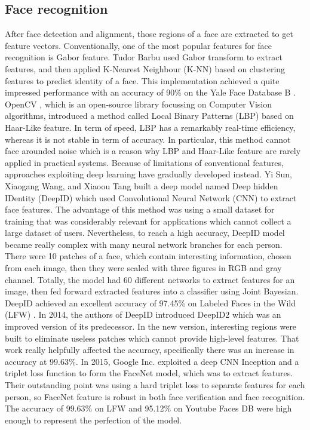 \documentclass[journal, twocolumn]{IEEEtran}
\begin{document}
\subsection{Face recognition}
After face detection and alignment, those regions of a face are extracted to get feature vectors. Conventionally, one of the most popular features for face recognition is Gabor feature. Tudor Barbu \cite{ref:recog-1} used Gabor transform to extract features, and then applied K-Nearest Neighbour (K-NN) based on clustering features to predict identity of a face. This implementation achieved a quite impressed performance with an accuracy of 90\% on the Yale Face Database B \cite{ref:data-yaleB}. OpenCV \cite{ref:recog-2}, which is an open-source library focussing on Computer Vision algorithms, introduced a method called Local Binary Patterns (LBP) based on Haar-Like feature. In term of speed, LBP has a remarkably real-time efficiency, whereas it is not stable in term of accuracy. In particular, this method cannot face arounded noise which is a reason why LBP and Haar-Like feature are rarely applied in practical systems. Because of limitations of conventional features, approaches exploiting deep learning have gradually developed instead. Yi Sun, Xiaogang Wang, and Xiaoou Tang \cite{ref:recog-3} built a deep model named Deep hidden IDentity (DeepID) which used Convolutional Neural Network (CNN) to extract face features. The advantage of this method was using a small dataset for training that was considerably relevant for applications which cannot collect a large dataset of users. Nevertheless, to reach a high accuracy, DeepID model became really complex with many neural network branches for each person. There were 10 patches of a face, which contain interesting information, chosen from each image, then they were scaled with three figures in RGB and gray channel. Totally, the model had 60 different networks to extract features for an image, then fed forward extracted features into a classifier using Joint Bayesian. DeepID achieved an excellent accuracy of 97.45\% on Labeled Faces in the Wild (LFW) \cite{ref:data-lfw}. In 2014, the authors of DeepID introduced DeepID2 \cite{ref:recog-4} which was an improved version of its predecessor. In the new version, interesting regions were built to eliminate useless patches which cannot provide high-level features. That work really helpfully affected the accuracy, specifically there was an increase in accuracy at 99.63\%. In 2015, Google Inc. \cite{ref:recog-5} exploited a deep CNN Inception \cite{ref:in-res} and a triplet loss function to form the FaceNet model, which was to extract features. Their outstanding point was using a hard triplet loss to separate features for each person, so FaceNet feature is robust in both face verification and face recognition. The accuracy of 99.63\% on LFW and 95.12\% on Youtube Faces DB \cite{ref:data-youtube} were high enough to represent the perfection of the model.
\end{document}
